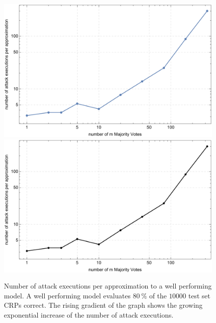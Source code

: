 
\vspace{0.25cm}
\begin{figure}[ht]
\ifx{}\undefined
{}
\else
	\if{}
	\centering
	\includegraphics[width=1.00\textwidth]{images/single-mv-classification-cma-attack-correlation.pdf}
	\else
	\includegraphics[width=1.00\textwidth]{images/single-mv-classification-cma-attack-correlation_mono.pdf}
	\fi
\fi
\caption[Needed \acs{CMA-ES} attack executions for \mpufs]{Number of attack executions per approximation to a well performing model. A well performing model evaluates $80\ \%$ of the $10000$ test set \acp{CRP} correct. The rising gradient of the graph shows the growing exponential increase of the number of attack executions.}
\label{fig:cmasingleattackcorrelation}
\end{figure}

